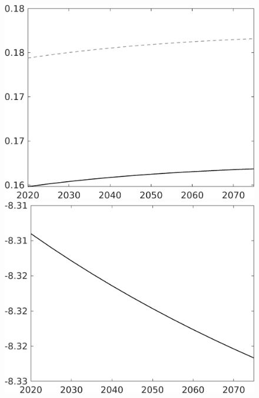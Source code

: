 \documentclass[12pt]{article}
\begin{document}
\begin{figure}[h!!]
\begin{minipage}[]{0.32\textwidth}
	\end{minipage}	 
	\begin{minipage}[]{0.32\textwidth}
		\includegraphics[width=1\textwidth]{../../codding_model/own_basedOnFried/optimalPol_010922_revision/figures/all_13Sept22/CompTaul_LFBAU_Reg0_Ln_spillover0_nsk0_xgr1_knspil1_sep1_countec0_GovRev0_etaa0.79_lgd0.png}
	\end{minipage}	
	\begin{minipage}[]{0.32\textwidth}
		\includegraphics[width=1\textwidth]{../../codding_model/own_basedOnFried/optimalPol_010922_revision/figures/all_13Sept22/CompTaul_LFBAUPer_Reg0_Lf_spillover0_nsk0_xgr1_knspil1_sep1_countec0_GovRev0_etaa0.79.png}

\end{minipage}
\end{figure}
\end{document}
